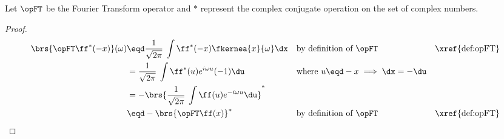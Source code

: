 \begin{theorem}
\label{thm:ft_conj}
\label{thm:ft_neg}
Let $\opFT$ be the Fourier Transform operator and $\ast$ represent the complex conjugate operation on the set of
complex numbers.
\end{theorem}
\begin{proof}
\begin{align*}
  \brs{\opFT\ff^\ast(-x)}(\omega)
     &\eqd \frac{1}{\sqrt{2\pi}}\:\int \ff^\ast(-x) \fkernea{x}{\omega}\dx
     &&    \text{by definition of $\opFT$}
     &&    \text{\xref{def:opFT}}
   \\&=    \frac{1}{\sqrt{2\pi}}\:\int \ff^\ast(u) e^{i\omega u}(-1)\du
     &&    \text{where $u\eqd-x\implies\dx=-\du$}
   \\&=    -\brs{\frac{1}{\sqrt{2\pi}}\:\int \ff(u) e^{-i\omega u}\du}^\ast
   \\&\eqd -\brs{\opFT\ff(x)}^\ast
     &&    \text{by definition of $\opFT$}
     &&    \text{\xref{def:opFT}}
\end{align*}
\end{proof}

